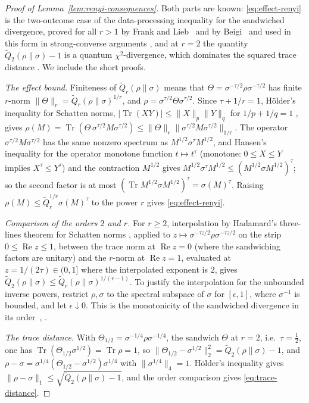 \documentclass[aps,prl,reprint,longbibliography,raggedbottom]{revtex4-2}
\newcommand{\norm}[1]{\lVert #1\rVert}
\newcommand{\abs}[1]{\lvert #1\rvert}
\DeclareMathOperator{\Tr}{Tr}
\DeclareMathOperator{\Rea}{Re}
\newcommand{\Qtil}{\widetilde Q}
\begin{document}
\begin{proof}[Proof of Lemma~\ref{lem:renyi-consequences}]
Both parts are known: \eqref{eq:effect-renyi} is the two-outcome case
of the data-processing inequality for the sandwiched divergence, proved
for all $r>1$ by Frank and Lieb~\cite{FL13} and by Beigi~\cite{Beigi13}
and used in this form in strong-converse arguments \cite{WWY14}, and at
$r=2$ the quantity $\Qtil_2(\rho\|\sigma)-1$ is a quantum
$\chi^2$-divergence, which dominates the squared trace distance
\cite{TKRVV10}. We include the short proofs.

\emph{The effect bound.} Finiteness of $\Qtil_r(\rho\|\sigma)$ means
that $\Theta=\sigma^{-\tau/2}\rho\sigma^{-\tau/2}$ has finite $r$-norm
$\norm\Theta_r=\Qtil_r(\rho\|\sigma)^{1/r}$, and
$\rho=\sigma^{\tau/2}\Theta\sigma^{\tau/2}$. Since $\tau+1/r=1$,
H\"older's inequality for Schatten norms,
$\abs{\Tr(XY)}\le\norm X_p\norm Y_q$ for $1/p+1/q=1$ \cite{Simon05},
gives
$\rho(M)=\Tr(\Theta\,\sigma^{\tau/2}M\sigma^{\tau/2})
\le\norm\Theta_r\norm{\sigma^{\tau/2}M\sigma^{\tau/2}}_{1/\tau}$. The
operator $\sigma^{\tau/2}M\sigma^{\tau/2}$ has the same nonzero spectrum
as $M^{1/2}\sigma^\tau M^{1/2}$, and Hansen's inequality for the operator
monotone function $t\mapsto t^\tau$ (monotone: $0\le X\le Y$ implies
$X^\tau\le Y^\tau$) and the contraction $M^{1/2}$ \cite{Hansen80}
gives
$M^{1/2}\sigma^\tau M^{1/2}\le(M^{1/2}\sigma M^{1/2})^\tau$; so the
second factor is at most $(\Tr M^{1/2}\sigma M^{1/2})^\tau=\sigma(M)^\tau$.
Raising $\rho(M)\le\Qtil_r^{1/r}\sigma(M)^\tau$ to the power $r$ gives
\eqref{eq:effect-renyi}.

\emph{Comparison of the orders $2$ and $r$.} For $r\ge2$, interpolation by
Hadamard's three-lines theorem for Schatten norms \cite{Simon05},
applied to $z\mapsto\sigma^{-\tau z/2}\rho\sigma^{-\tau z/2}$ on
the strip $0\le\Rea z\le1$, between the trace norm at $\Rea z=0$
(where the sandwiching factors are unitary) and the $r$-norm at
$\Rea z=1$, evaluated at $z=1/(2\tau)\in(0,1]$ where the interpolated
exponent is $2$, gives
$\Qtil_2(\rho\|\sigma)\le\Qtil_r(\rho\|\sigma)^{1/(r-1)}$. To justify
the interpolation for the unbounded inverse powers, restrict
$\rho,\sigma$ to the spectral subspace of $\sigma$ for $[\epsilon,1]$,
where $\sigma^{-1}$ is bounded, and let $\epsilon\downarrow0$. This is the monotonicity of the sandwiched
divergence in its order~\cite[Theorem~7]{Beigi13},
\cite[Theorem~7]{ML13}.

\emph{The trace distance.} With
$\Theta_{1/2}=\sigma^{-1/4}\rho\sigma^{-1/4}$, the sandwich $\Theta$ at
$r=2$, i.e.\ $\tau=\frac12$,
one has $\Tr(\Theta_{1/2}\sigma^{1/2})=\Tr\rho=1$, so
$\norm{\Theta_{1/2}-\sigma^{1/2}}_2^2=\Qtil_2(\rho\|\sigma)-1$, and
$\rho-\sigma=\sigma^{1/4}({\Theta_{1/2}-\sigma^{1/2}})\sigma^{1/4}$ with
$\norm{\sigma^{1/4}}_4=1$. H\"older's inequality gives
$\norm{\rho-\sigma}_1\le\sqrt{\Qtil_2(\rho\|\sigma)-1}$, and the order
comparison gives \eqref{eq:trace-distance}.
\end{proof}
\end{document}
